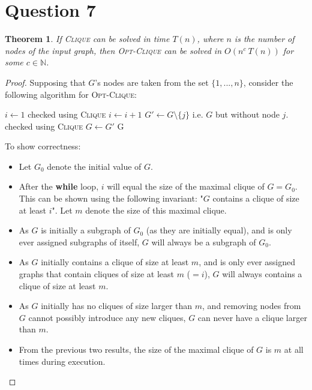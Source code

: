 \documentclass[a4paper,12pt]{scrartcl}
\newtheorem{theorem}{Theorem}
\begin{document}
\section{Question 7}

\begin{theorem}
    If \textsc{Clique} can be solved in time $T(n)$, where $n$ is the number of nodes of the input graph, then \textsc{Opt-Clique} can be solved in $O(n^c\ T(n))$ for some $c \in \mathbb{N}$.
\end{theorem}
\begin{proof}
    Supposing that $G$'s nodes are taken from the set $\{1, ..., n\}$, consider the following algorithm for \textsc{Opt-Clique}:
    \begin{algorithmic}[1]
        \State $i \gets 1$
         \Comment checked using \textsc{Clique}
            \State $i \gets i+1$
        \EndWhile
            \State $G' \gets G \setminus \{ j \}$ \Comment i.e. $G$ but without node $j$.
             \Comment checked using \textsc{Clique}
                \State $G \gets G'$
            \EndIf
        \EndFor
        \State \Return G
        \EndFunction
    \end{algorithmic}
    To show correctness:
    \begin{itemize}
        \item Let $G_0$ denote the initial value of $G$.
        \item After the \textbf{while} loop, $i$ will equal the size of the maximal clique of $G = G_0$. This can be shown using the following invariant: "$G$ contains a clique of size at least $i$". Let $m$ denote the size of this maximal clique.
        \item As $G$ is initially a subgraph of $G_0$ (as they are initially equal), and is only ever assigned subgraphs of itself, $G$ will always be a subgraph of $G_0$.
        \item As $G$ initially contains a clique of size at least $m$, and is only ever assigned graphs that contain cliques of size at least $m$ ($=i$), $G$ will always contains a clique of size at least $m$.
        \item As $G$ initially has no cliques of size larger than $m$, and removing nodes from $G$ cannot possibly introduce any new cliques, $G$ can never have a clique larger than $m$.
        \item From the previous two results, the size of the maximal clique of $G$ is $m$ at all times during execution.

\end{itemize}
\end{proof}
\end{document}
